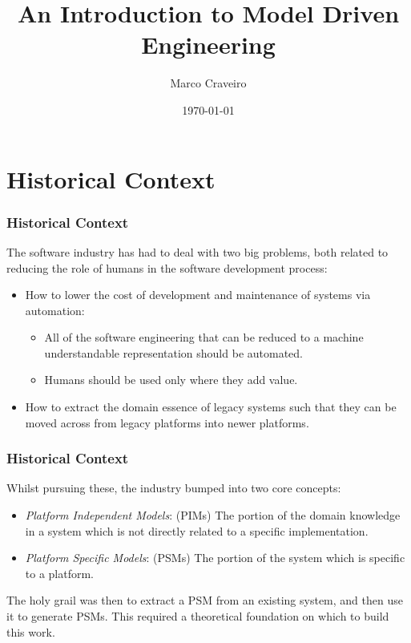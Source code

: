 \documentclass{beamer}
\title{An Introduction to Model Driven Engineering}
\author{Marco Craveiro}
\date{\today}
\begin{document}

\section{Historical Context}

\begin{frame}
\frametitle{Historical Context}

The software industry has had to deal with two big problems, both
related to reducing the role of humans in the software development
process:
\pause

\begin{itemize}
\item How to lower the cost of development and maintenance of systems
  via automation:
  \pause

  \begin{itemize}
  \item All of the software engineering that can be reduced to a
    machine understandable representation should be automated.
    \pause
  \item Humans should be used only where they add value.
    \pause
  \end{itemize}

\item How to extract the domain essence of legacy systems such that
  they can be moved across from legacy platforms into newer platforms.
\end{itemize}

\end{frame}

\begin{frame}
\frametitle{Historical Context}

Whilst pursuing these, the industry bumped into two core concepts:
\pause

\begin{itemize}
\item \emph{Platform Independent Models}: (PIMs) The portion of the
  domain knowledge in a system which is not directly related to a
  specific implementation.
  \pause

\item \emph{Platform Specific Models}: (PSMs) The portion of the
  system which is specific to a platform.
\end{itemize}

\pause

The holy grail was then to extract a PSM from an existing system, and
then use it to generate PSMs. This required a theoretical foundation
on which to build this work.

\end{frame}
\end{document}
